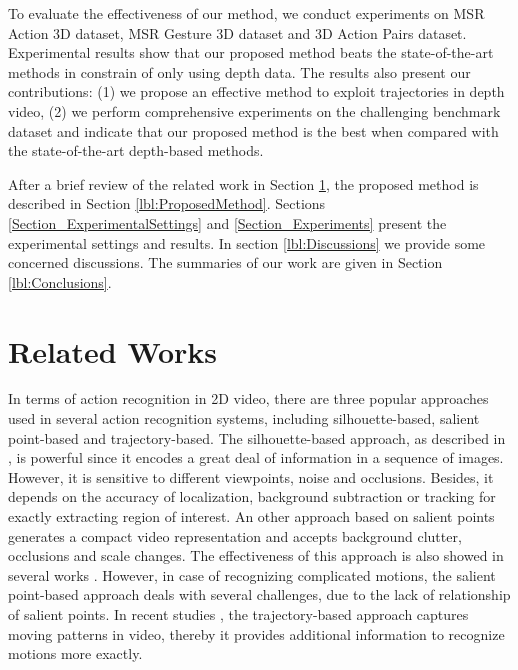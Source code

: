\documentclass[final,3p,times,twocolumn]{elsarticle}
\begin{document}
To evaluate the effectiveness of our method, we conduct experiments on MSR Action 3D dataset, MSR Gesture 3D dataset and 3D Action Pairs dataset.
Experimental results show that our proposed method beats the state-of-the-art methods in constrain of only using depth data.
The results also present our contributions: (1) we propose an effective method to exploit trajectories in depth video, (2) we perform comprehensive experiments on the challenging benchmark dataset and indicate that our proposed method is the best when compared with the state-of-the-art depth-based methods.

After a brief review of the related work in Section \ref{lbl:RelatedWorks}, the proposed method is described in Section \ref{lbl:ProposedMethod}. Sections \ref{Section_ExperimentalSettings} and \ref{Section_Experiments} present the experimental settings and results. In section \ref{lbl:Discussions} we provide some concerned discussions. The summaries of our work are given in Section \ref{lbl:Conclusions}.

\section{Related Works}
\label{lbl:RelatedWorks}

In terms of action recognition in 2D video, there are three popular approaches used in several action recognition systems, including silhouette-based, salient point-based and trajectory-based.
The silhouette-based approach, as described in \cite{blank2005actions, ke2007event, vitaladevuni2008action, yilmaz2005actions}, is powerful since it encodes a great deal of information in a sequence of images.
However, it is sensitive to different viewpoints, noise and occlusions.
Besides, it depends on the accuracy of localization, background subtraction or tracking for exactly extracting region of interest.
An other approach based on salient points generates a compact video representation and accepts background clutter, occlusions and scale changes.
The effectiveness of this approach is also showed in several works \cite{laptev2005space, dollar2005behavior, laptev2008learning, bregonzio2009recognising, klaser2008aspatiotemporal, willems2008efficient}.
However, in case of recognizing complicated motions, the salient point-based approach deals with several challenges, due to the lack of relationship of salient points.
In recent studies \cite{matikainen2009trajectons, messing2009activity, sun2009hierarchical}, the trajectory-based approach captures moving patterns in video, thereby it provides additional information to recognize motions more exactly.
\end{document}
